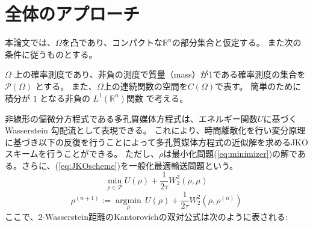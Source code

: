 \begin{comment}
研究では、以下の研究内容を検討します。

* BFM を PME に適用するための一般化
* 提案するソルバーの効率性の評価
* 提案するソルバーの他のソルバーとの比較

BFM を PME に適用するためには、以下の点に留意する必要があります。

* PME は、剛性があり非線形な方程式であるため、BFM の解法の適応が必要となる。
* PME の境界条件は、通常、PDE の解法に固有の形状となる。BFM の解法では、これらの境界条件をどのように扱うかが課題となる。

提案するソルバーの効率性を評価するためには、以下の点に留意する必要があります。

* ソルバーの収束精度と収束速度を評価する。
* ソルバーの計算コストを評価する。

提案するソルバーと他のソルバーとの比較を行うためには、以下の点に留意する必要があります。

* ソルバーの収束精度と収束速度を比較する。
* ソルバーの計算コストを比較する。

本研究では、これらの点に留意して、提案するソルバーの有効性を検証します。

\end{comment}
















\section{全体のアプローチ}
\label{sect:全体のアプローチ}
本論文では、$\Omega$を凸であり、コンパクトな$\mathbb{R}^n$の部分集合と仮定する。
また次の条件に従うものとする。
\begin{dfn}
\label{dfn:1}
    $\Omega$ 上の確率測度であり、非負の測度で質量（mass）が1である確率測度の集合を $\mathcal{P} (\Omega)$ とする。
    また、$\Omega$上の連続関数の空間を$C(\Omega)$で表す。
    簡単のために積分が \(1\) となる非負の \(L^1(\mathbb{R}^n)\)関数 で考える。
\end{dfn}

非線形の偏微分方程式である多孔質媒体方程式は、エネルギー関数$U$に基づくWasserstein 勾配流として表現できる。
これにより、時間離散化を行い変分原理に基づき以下の反復を行うことによって多孔質媒体方程式の近似解を求めるJKOスキームを行うことができる。
ただし、$\rho$は最小化問題(\ref{eq:minimizer})の解である。さらに、(\ref{eq:JKOscheme})を一般化最適輸送問題という。
\begin{equation}
    \label{eq:minimizer}
    \min_{\rho \in \mathcal{P}} U(\rho) + \frac{1}{2\tau} W_2^2(\rho, \mu)
\end{equation}
\begin{equation}
    \label{eq:JKOscheme}
    \rho^{(n+1)} := \underset{\rho}{\operatorname{argmin}}\, U(\rho) + \frac{1}{2\tau} W_2^2(\rho, \rho^{(n)})
\end{equation}
ここで、2-Wasserstein距離のKantorovichの双対公式は次のように表される:

